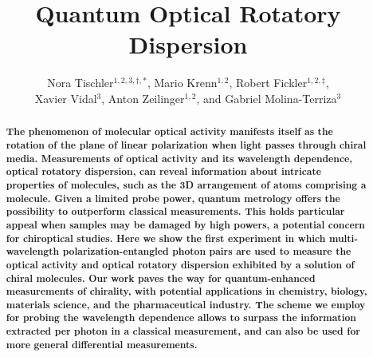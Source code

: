 \documentclass[12pt,preprint]{revtex4}
\begin{document}
 


\title{\bf{Quantum Optical Rotatory Dispersion}}

\author{Nora Tischler$^{1,2,3,\dagger,*}$, Mario Krenn$^{1,2}$, Robert Fickler$^{1,2,\ddagger }$, \\Xavier Vidal$^{3}$, Anton Zeilinger$^{1,2}$, and Gabriel Molina-Terriza$^{3}$}





\begin{abstract}
{\vspace{0.9cm}\bf \noindent The phenomenon of molecular optical activity manifests itself as the rotation of the plane of linear polarization when light passes through chiral media. Measurements of optical activity and its wavelength dependence, optical rotatory dispersion, can reveal information about intricate properties of molecules, such as the 3D arrangement of atoms comprising a molecule. 
Given a limited probe power, quantum metrology offers the possibility to outperform classical measurements. This holds particular appeal when samples may be damaged by high powers, a potential concern for chiroptical studies.
Here we show the first experiment in which multi-wavelength polarization-entangled photon pairs are used to measure the optical activity and optical rotatory dispersion exhibited by a solution of chiral molecules. 
Our work paves the way for quantum-enhanced measurements of chirality, with potential applications in chemistry, biology, materials science, and the pharmaceutical industry. The scheme we employ for probing the wavelength dependence allows to surpass the information extracted per photon in a classical measurement, and can also be used for more general differential measurements.}
\end{abstract}
\end{document}
